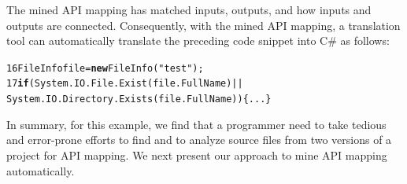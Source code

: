 The mined API mapping has matched inputs, outputs, and how inputs
and outputs are connected. Consequently, with the mined API mapping,
a translation tool can automatically translate the preceding code
snippet into C\# as follows:

\begin{CodeOut}\vspace*{-1ex}
\begin{alltt}
16  FileInfo file = \textbf{new} FileInfo("test");
17  \textbf{if}(System.IO.File.Exist(file.FullName)||
       System.IO.Directory.Exists(file.FullName))\{...\}
\end{alltt}
\end{CodeOut}\vspace*{-1ex}

In summary, for this example, we find that a programmer need to take
tedious and error-prone efforts to find and to analyze source files
from two versions of a project for API mapping. We next present our
approach to mine API mapping automatically.
%
%
%
%
